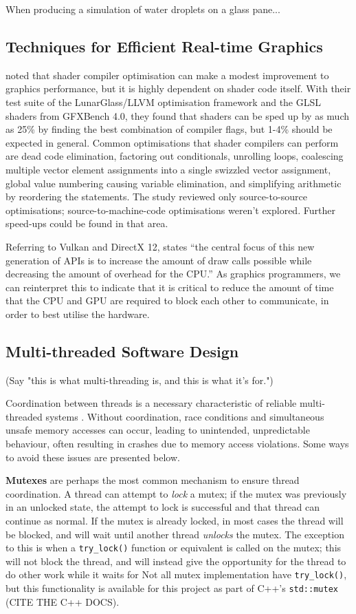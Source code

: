 \documentclass[11pt, a4paper, twocolumn]{article}
\begin{document}
When producing a simulation of water droplets on a glass pane... \citet{Chen2012}

\subsection{Techniques for Efficient Real-time Graphics}

\citet{Crawford2018} noted that shader compiler optimisation can make a modest improvement to graphics performance, but it is highly dependent on shader code itself. With their test suite of the LunarGlass/LLVM optimisation framework and the GLSL shaders from GFXBench 4.0, they found that shaders can be sped up by as much as 25\% by finding the best combination of compiler flags, but 1-4\% should be expected in general. Common optimisations that shader compilers can perform are dead code elimination, factoring out conditionals, unrolling loops, coalescing multiple vector element assignments into a single swizzled vector assignment, global value numbering causing variable elimination, and simplifying arithmetic by reordering the statements. The study reviewed only source-to-source optimisations; source-to-machine-code optimisations weren't explored. Further speed-ups could be found in that area.

Referring to Vulkan and DirectX 12, \citet{Joseph2016} states ``the central focus of this new generation of APIs is to increase the amount of draw calls possible while decreasing the amount of overhead for the CPU.'' As graphics programmers, we can reinterpret this to indicate that it is critical to reduce the amount of time that the CPU and GPU are required to block each other to communicate, in order to best utilise the hardware.

\subsection{Multi-threaded Software Design}

(Say "this is what multi-threading is, and this is what it's for.")

Coordination between threads is a necessary characteristic of reliable multi-threaded systems \citep{Powell}. Without coordination, race conditions and simultaneous unsafe memory accesses can occur, leading to unintended, unpredictable behaviour, often resulting in crashes due to memory access violations. Some ways to avoid these issues are presented below.

\textbf{Mutexes} are perhaps the most common mechanism to ensure thread coordination. A thread can attempt to \emph{lock} a mutex; if the mutex was previously in an unlocked state, the attempt to lock is successful and that thread can continue as normal. If the mutex is already locked, in most cases the thread will be blocked, and will wait until another thread \emph{unlocks} the mutex. The exception to this is when a \verb|try_lock()| function or equivalent is called on the mutex; this will not block the thread, and will instead give the opportunity for the thread to do other work while it waits for  Not all mutex implementation have \verb|try_lock()|, but this functionality is available for this project as part of C++'s \verb|std::mutex| (CITE THE C++ DOCS).
\end{document}
